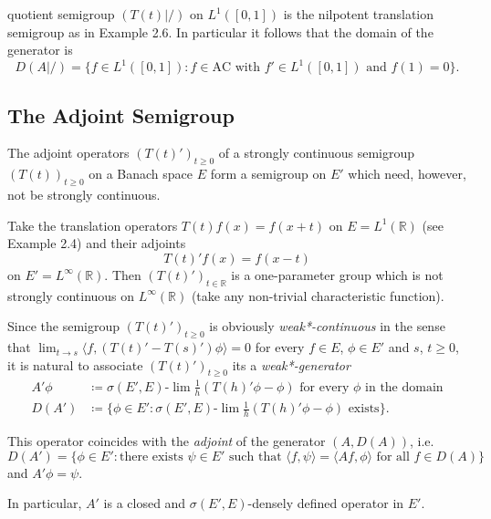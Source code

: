 \newpage

quotient semigroup $(T(t)|/)$ on $L^{1}([0,1])$ is the nilpotent translation semigroup as in Example 2.6.
In particular it follows that the domain of the generator is
\[
    D(A|/) = \{f \in L^{1}([0,1]) : f \in \text{AC} \text{ with } f' \in L^{1}([0,1]) \text{ and } f(1) = 0\}.
\]
\subsection{The Adjoint Semigroup}\label{subsec:a1-3.4}
The adjoint operators $(T(t)')_{t \geq 0}$ of a strongly continuous semigroup $(T(t))_{t \geq 0}$ on a Banach space $E$ form a semigroup on $E'$ which need, however, not be strongly continuous.

\begin{example}\label{ex:a1-3.2}
Take the translation operators $T(t)f(x) = f(x+t)$ on $E = L^{1}(\mathbb{R})$ (see Example 2.4) and their adjoints
\[
    T(t)'f(x) = f(x-t)
\]
on $E' = L^{\infty}(\mathbb{R})$.
Then $(T(t)')_{t \in \mathbb{R}}$ is a one-parameter group which is not strongly continuous on $L^{\infty}(\mathbb{R})$ (take any non-trivial characteristic function).
\end{example}

Since the semigroup $(T(t)')_{t \geq 0}$ is obviously \emph{weak*-continuous} in the sense that $\lim_{t \to s} \langle f,(T(t)'-T(s)')\phi \rangle = 0$ for every $f \in E$, $\phi \in E'$ and $s$, $t \geq 0$, it is natural to associate $(T(t)')_{t \geq 0}$ its a \emph{weak*-generator}
\begin{align*}
    A'\phi &\coloneqq \sigma(E',E)\text{-}\lim\frac{1}{h}(T(h)'\phi-\phi) \text{ for every } \phi \text{ in the domain} \\
    D(A') &\coloneqq \{\phi \in E': \sigma(E',E)\text{-}\lim\frac{1}{h}(T(h)'\phi-\phi) \text{ exists}\}.
\end{align*}

This operator coincides with the \emph{adjoint} of the generator $(A,D(A))$, i.e.
\[
    D(A') = \{\phi \in E' : \text{there exists } \psi \in E' \text{ such that } \langle f,\psi \rangle = \langle Af,\phi \rangle \text{ for all } f \in D(A)\}
\]
and $A'\phi = \psi$.

In particular, $A'$ is a closed and $\sigma(E',E)$-densely defined operator in $E'$.

